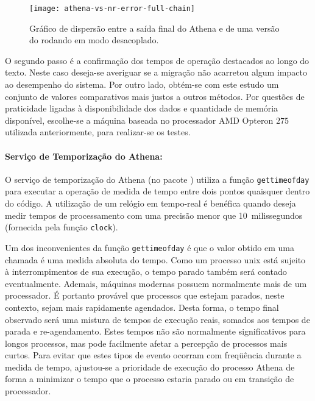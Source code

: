 \begin{figure}
\begin{center}
\texttt{[image: athena-vs-nr-error-full-chain]}
\end{center}
\caption{Gráfico de dispersão entre a saída final do Athena e de uma versão do
 rodando em modo desacoplado.}
\label{fig:athena-vs-nr-full}
\end{figure}

O segundo passo é a confirmação dos tempos de operação destacados ao longo do
texto. Neste caso deseja-se averiguar se a migração não acarretou algum
impacto ao desempenho do sistema. Por outro lado, obtém-se com este estudo um
conjunto de valores comparativos mais justos a outros métodos. Por questões de
praticidade ligadas à disponibilidade dos dados e quantidade de memória
disponível, escolhe-se a máquina baseada no processador AMD Opteron $275$
utilizada anteriormente, para realizar-se os testes.

\paragraph{Serviço de Temporização do Athena:} O serviço de temporização do
Athena (no pacote ) utiliza a função \texttt{gettimeofday}
\cite{web:gcc-libc} para executar a operação de medida de tempo entre dois
pontos quaisquer dentro do código. A utilização de um relógio em tempo-real é
benéfica quando deseja medir tempos de processamento com uma precisão menor
que 10~milissegundos (fornecida pela função \texttt{clock}). 

Um dos inconvenientes da função \texttt{gettimeofday} é que o valor obtido em
uma chamada é uma medida absoluta do tempo. Como um processo unix está sujeito
à interrompimentos de sua execução, o tempo parado também será contado
eventualmente. Ademais, máquinas modernas possuem normalmente mais de um
processador. É portanto provável que processos que estejam parados, neste
contexto, sejam mais rapidamente agendados. Desta forma, o tempo final
observado será uma mistura de tempos de execução reais, somados aos tempos de
parada e re-agendamento. Estes tempos não são normalmente significativos para
longos processos, mas pode facilmente afetar a percepção de processos mais
curtos. Para evitar que estes tipos de evento ocorram com freqüência durante
a medida de tempo, ajustou-se a prioridade de execução do processo Athena de
forma a minimizar o tempo que o processo estaria parado ou em transição de
processador.

